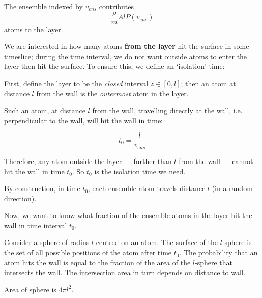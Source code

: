 \documentclass{paper}
\begin{document}
The ensemble indexed by $v_{ens}$ contributes
\[ \frac{\rho}{m} A l P(v_{ens}) \]
atoms to the layer.

\vspace{1em}
We are interested in how many atoms \textbf{from the layer} hit the surface in some timeslice; during the time interval, we do not want outside atoms to enter the layer then hit the surface. To ensure this, we define an `isolation' time:

First, define the layer to be the \emph{closed} interval $z \in [0,l]$; then an atom at distance $l$ from the wall is the \emph{outermost} atom in the layer.

Such an atom, at distance $l$ from the wall, travelling directly at the wall, i.e. perpendicular to the wall, will hit the wall in time:

\[ t_{0} = \frac{l}{v_{ens}}\] 

Therefore, any atom outside the layer --- further than $l$ from the wall --- cannot hit the wall in time $t_{0}$.  So $t_{0}$ is the isolation time we need.

By construction, in time $t_{0}$, each ensemble atom travels distance $l$ (in a random direction).

\vspace*{1em}
Now, we want to know what fraction of the ensemble atoms in the layer hit the wall in time interval $t_{0}$.  

Consider a sphere of radius $l$ centred on an atom. The surface of the $l$-sphere is the set of all possible positions of the atom after time $t_{0}$.
The probability that an atom hits the wall is equal to the fraction of the area of the  $l$-sphere that intersects the wall. The intersection area in turn depends on distance to wall.


\vspace{1em}
Area of sphere is $4\pi l^{2}$.
\end{document}
